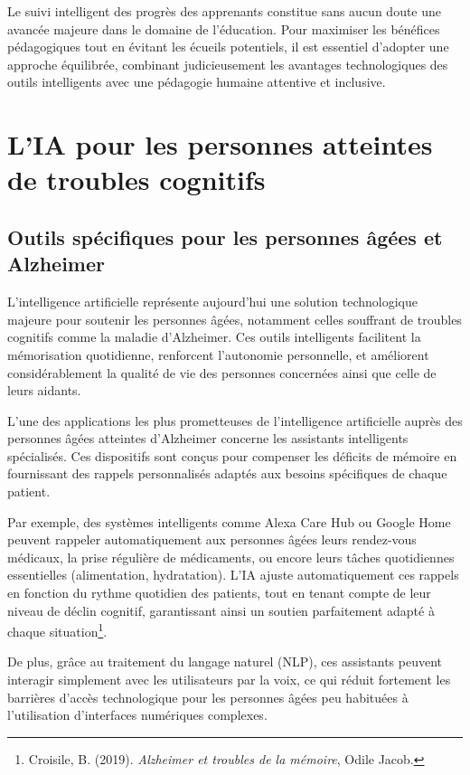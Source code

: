 \documentclass[11pt,a4paper]{report}
\begin{document}
Le suivi intelligent des progrès des apprenants constitue sans aucun doute une avancée majeure dans le domaine de l’éducation. Pour maximiser les bénéfices pédagogiques tout en évitant les écueils potentiels, il est essentiel d’adopter une approche équilibrée, combinant judicieusement les avantages technologiques des outils intelligents avec une pédagogie humaine attentive et inclusive.

\section{L’IA pour les personnes atteintes de troubles cognitifs}

\subsection{Outils spécifiques pour les personnes âgées et Alzheimer}

L’intelligence artificielle représente aujourd’hui une solution technologique majeure pour soutenir les personnes âgées, notamment celles souffrant de troubles cognitifs comme la maladie d’Alzheimer. Ces outils intelligents facilitent la mémorisation quotidienne, renforcent l’autonomie personnelle, et améliorent considérablement la qualité de vie des personnes concernées ainsi que celle de leurs aidants.

L’une des applications les plus prometteuses de l’intelligence artificielle auprès des personnes âgées atteintes d’Alzheimer concerne les assistants intelligents spécialisés. Ces dispositifs sont conçus pour compenser les déficits de mémoire en fournissant des rappels personnalisés adaptés aux besoins spécifiques de chaque patient.

Par exemple, des systèmes intelligents comme Alexa Care Hub ou Google Home peuvent rappeler automatiquement aux personnes âgées leurs rendez-vous médicaux, la prise régulière de médicaments, ou encore leurs tâches quotidiennes essentielles (alimentation, hydratation). L’IA ajuste automatiquement ces rappels en fonction du rythme quotidien des patients, tout en tenant compte de leur niveau de déclin cognitif, garantissant ainsi un soutien parfaitement adapté à chaque situation\footnote{Croisile, B. (2019). \textit{Alzheimer et troubles de la mémoire}, Odile Jacob.}.

De plus, grâce au traitement du langage naturel (NLP), ces assistants peuvent interagir simplement avec les utilisateurs par la voix, ce qui réduit fortement les barrières d’accès technologique pour les personnes âgées peu habituées à l’utilisation d’interfaces numériques complexes.
\end{document}
